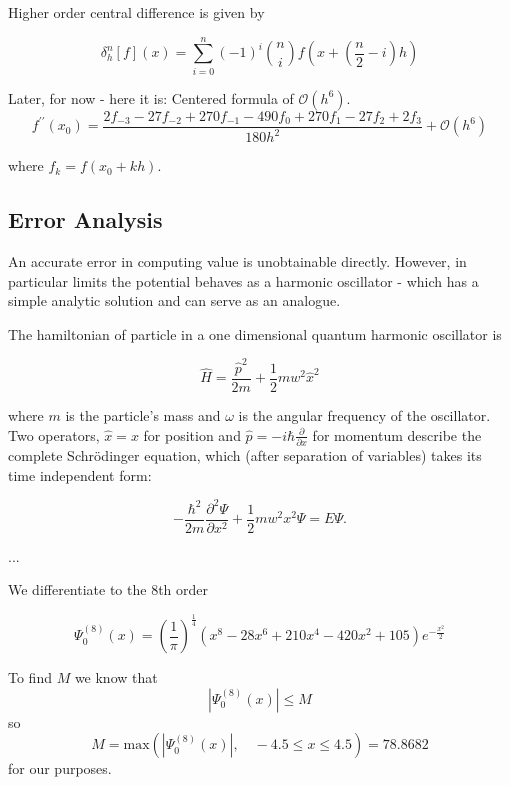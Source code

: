 Higher order central difference is given by

\begin{equation}
\delta^n_h[f](x) = \sum_{i = 0}^{n} (-1)^i \binom{n}{i} f\left(x + \left(\frac{n}{2} - i\right) h\right)
\end{equation}

Later, for now - here it is: Centered formula of $\mathcal{O}(h^{6})$.
\begin{equation}
f^{\prime\prime}(x_0)=\frac{2f_{-3}-27f_{-2}+270f_{-1}-490f_{0}+270f_{1}-27f_{2}+2f_{3}}{180h^{2}}+\mathcal{O}(h^{6})
\end{equation}

where $f_k = f(x_0 + kh)$.

\subsection{Error Analysis}
An accurate error in computing value is unobtainable directly. However, in particular limits the potential behaves as a harmonic oscillator - which has a simple analytic solution and can serve as an analogue.

The hamiltonian of particle in a one dimensional quantum harmonic oscillator is

\begin{equation}
\widehat{H} = \frac{\widehat{p}^2}{2m}+\frac{1}{2}mw^2\widehat{x}^2
\end{equation}

where $m$ is the particle's mass and $ω$ is the angular frequency of the oscillator. Two operators, $\widehat{x} = x$ for position and $\widehat{p} = -i\hbar \frac{\partial}{\partial x}$ for momentum describe the complete Schr\"{o}dinger equation, which (after separation of variables) takes its time independent form:

\begin{equation}
-\frac{\hbar^2}{2m}\frac{\partial^2 \Psi}{\partial x^2}+\frac{1}{2}mw^2x^2 \Psi = E\Psi.
\end{equation}

...

We differentiate to the 8th order

\begin{equation}
\Psi_0^{(8)}(x) = \left(\frac{1}{\pi}\right)^{\frac{1}{4}}\left(x^8-28x^6+210x^4-420x^2+105\right)e^{-\frac{x^2}{2}}
\label{eq:7pt}
\end{equation}

To find $M$ we know that
\begin{equation}
 \left|\Psi_0^{(8)}(x)\right| \leq M
\end{equation}
so
\begin{equation}
M = \mathrm{max}\left(\left|\Psi_0^{(8)}(x)\right|, \quad -4.5 \leq x \leq 4.5\right) = 78.8682
\end{equation}
for our purposes.


